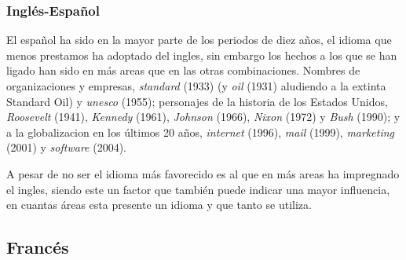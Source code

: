 \subsubsection*{Inglés-Español} %
El español ha sido en la mayor parte de los periodos de diez años,  el idioma
que menos prestamos ha adoptado del ingles, sin embargo los hechos a los que se
han ligado han sido en más areas que en las otras combinaciones.  Nombres de
organizaciones y empresas,  \textit{standard} (1933) (y \textit{oil} (1931)
aludiendo a la extinta Standard Oil) y \textit{unesco} (1955);  personajes de
la historia de los Estados Unidos,  \textit{Roosevelt} (1941), \textit{Kennedy}
(1961), \textit{Johnson} (1966),  \textit{Nixon} (1972) y \textit{Bush} (1990);
y a la globalizacion en los últimos 20 años, \textit{internet} (1996),
\textit{mail} (1999), \textit{marketing} (2001) y \textit{software} (2004).   

A pesar de no ser el idioma más favorecido es al que en más areas ha impregnado
el ingles, siendo este un factor que también puede indicar una mayor
influencia,  en cuantas áreas esta presente un idioma y que tanto se utiliza. 

\subsection{Francés} %

